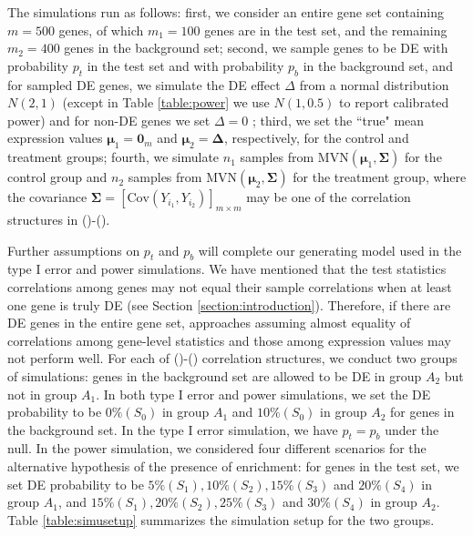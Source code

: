 	The simulations run as follows: first, we consider an entire gene set containing $m=500$ genes,
	of which $m_1 = 100$ genes are in the test set, and the
	remaining $m_2=400$ genes in the background set; second, we sample genes to be DE with 
	probability 
	$p_t$ in the test set and with probability $p_b$ in the background set, and for sampled DE 
	genes, we simulate the DE effect $\Delta$ from  a normal distribution $N(2, 1)$ (except in 
	Table \ref{table:power} we use $N(1, 0.5)$ to report calibrated power) and for non-DE genes we 
	set $\Delta= 0$ ; third, we set the ``true" mean expression values $\bm \mu_1 = \bm 0_m$ and 
	$\bm \mu_2 = \bm \Delta$, respectively,
	for the control and treatment groups; fourth, we simulate $n_1$ samples from $\text{MVN}(\bm 
	\mu_1,
	\bm \Sigma)$ for the control group and $n_2$ samples from $\text{MVN}(\bm \mu_2, \bm \Sigma)$ 
	for
	the treatment group, where the covariance $\bm \Sigma = \left[\text{Cov}(Y_{i_1},
	Y_{i_2})\right]_{m\times m}$ may be one of the correlation structures in (\aaCase)-(\fCase).
	
	Further assumptions on $p_t$ and $p_b$ will complete our generating model used in the type I 
	error and power simulations. %
	We have mentioned that the test statistics correlations among genes may
	not equal their sample correlations when at least one gene is truly DE (see Section 
	\ref{section:introduction}). Therefore, if there are 
	DE genes in the entire gene set, approaches assuming
	almost equality of correlations among gene-level statistics and those among expression values 
	may not perform well. For each of 
	(\aaCase)-(\fCase) correlation structures, we conduct two groups of simulations: genes in the 
	background set are allowed to be DE in group $A_2$ but 
	not in group $A_1$.  In both type I error and power 
	simulations, we set the DE
	probability to be $0\%(S_0)$ in group $A_1$ and $10\%(S_0)$ in group $A_2$ for genes in the
	background set.
	 In the type I error simulation, we have $p_t = p_b$ under the null. In the power
	simulation, we considered four different scenarios for the alternative hypothesis of the 
	presence of enrichment: for genes in the test set, we set DE
	probability to be $5\% (S_1), 10\%(S_2), 15\%(S_3)$ and $20\%(S_4)$ in group $A_1$, and 
	$15\%(S_1),
	20\%(S_2), 25\%(S_3)$ and $30\%(S_4)$ in group $A_2$. Table \ref{table:simusetup} summarizes the
	simulation setup for the two groups.
	

